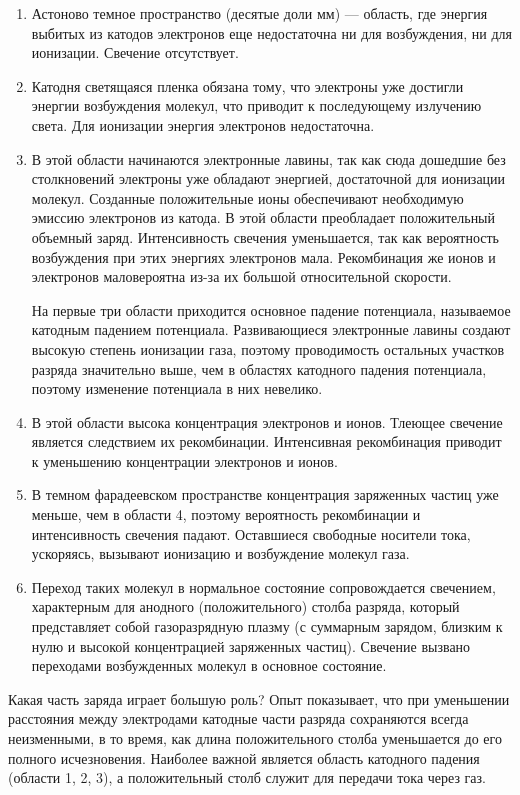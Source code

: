 \documentclass[a4paper, 12pt]{article}
\begin{document}
	\begin{enumerate}
		\item Астоново темное пространство (десятые доли мм) — область, где энергия выбитых из катодов электронов еще недостаточна ни для возбуждения, ни для ионизации. Свечение отсутствует.
		\item Катодня светящаяся пленка обязана тому, что электроны уже достигли энергии возбуждения молекул, что приводит к последующему излучению света. Для ионизации энергия электронов недостаточна.
		\item В этой области начинаются электронные лавины, так как сюда дошедшие без столкновений электроны уже обладают энергией, достаточной для ионизации молекул. Созданные положительные ионы обеспечивают необходимую эмиссию электронов из катода. В этой области преобладает положительный объемный заряд. Интенсивность свечения уменьшается, так как вероятность возбуждения при этих энергиях электронов мала. Рекомбинация же ионов и электронов маловероятна из-за их большой относительной скорости.\par
		На первые три области приходится основное падение потенциала, называемое катодным падением потенциала. Развивающиеся электронные лавины создают высокую степень ионизации газа, поэтому проводимость остальных участков разряда значительно выше, чем в областях катодного падения потенциала, поэтому изменение потенциала в них невелико.
		\item В этой области высока концентрация электронов и ионов. Тлеющее свечение является следствием их рекомбинации. Интенсивная рекомбинация приводит к уменьшению концентрации электронов и ионов.
		\item В темном фарадеевском пространстве концентрация заряженных частиц уже меньше, чем в области 4, поэтому вероятность рекомбинации и интенсивность свечения падают. Оставшиеся свободные носители тока, ускоряясь, вызывают ионизацию и возбуждение молекул газа.
		\item Переход таких молекул в нормальное состояние сопровождается свечением, характерным для анодного (положительного) столба разряда, который представляет собой газоразрядную плазму (с суммарным зарядом, близким к нулю и высокой концентрацией заряженных частиц). Свечение вызвано переходами возбужденных молекул в основное состояние.
	\end{enumerate}
	\par
	Какая часть заряда играет большую роль? Опыт показывает, что при уменьшении расстояния между электродами катодные части разряда сохраняются всегда неизменными, в то время, как длина положительного столба уменьшается до его полного исчезновения. Наиболее важной является область катодного падения (области 1, 2, 3), а положительный столб служит для передачи тока через газ.\par
\end{document}
